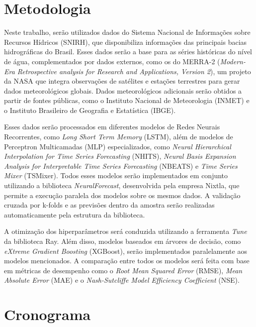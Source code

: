 \documentclass[
	12pt,				%
	openright,			%
	a4paper,			%
	english,			%
	french,				%
	spanish,			%
	brazil				%
	]{article}
\begin{document}
\section{Metodologia}
Neste trabalho, serão utilizados dados do Sistema Nacional de Informações sobre Recursos Hídricos (SNIRH), que 
disponibiliza informações das principais bacias hidrográficas do Brasil\cite{snirh}. Esses dados serão a base para as 
séries históricas do nível de água, complementados por dados externos, como os do MERRA-2 (\textit{Modern-Era 
Retrospective analysis for Research and Applications, Version 2}), um projeto da NASA que integra observações de 
satélites e estações terrestres para gerar dados meteorológicos globais\cite{nasa}. Dados meteorológicos adicionais 
serão obtidos a partir de fontes públicas, como o Instituto Nacional de Meteorologia (INMET) e o Instituto Brasileiro de 
Geografia e Estatística (IBGE)\cite{inmet}\cite{ibge}.

Esses dados serão processados em diferentes modelos de Redes Neurais Recorrentes, como \textit{Long Short Term Memory} 
(LSTM)\cite{hochreiter}, além de modelos de Perceptron Multicamadas (MLP) especializados, como \textit{Neural 
Hierarchical Interpolation for Time Series Forecasting} (NHITS)\cite{challu}, \textit{Neural Basis Expansion Analysis 
for Interpretable Time Series Forecasting} (NBEATS)\cite{oreshkin} e \textit{Time Series Mixer} (TSMixer)\cite{chen}. 
Todos esses modelos serão implementados em conjunto utilizando a biblioteca \textit{NeuralForecast}, desenvolvida pela 
empresa Nixtla\cite{neuralforecast}, que permite a execução paralela dos modelos sobre os mesmos dados. A validação 
cruzada por k-folds e as previsões dentro da amostra serão realizadas automaticamente pela estrutura da biblioteca.

A otimização dos hiperparâmetros será conduzida utilizando a ferramenta \textit{Tune} da biblioteca Ray\cite{tune}. Além 
disso, modelos baseados em árvores de decisão, como \textit{eXtreme Gradient Boosting} (XGBoost)\cite{chen_xgboost}, 
serão implementados paralelamente aos modelos mencionados. A comparação entre todos os  modelos será feita com base em 
métricas de desempenho como o \textit{Root Mean Squared Error} (RMSE), \textit{Mean Absolute Error} (MAE) e o 
\textit{Nash-Sutcliffe Model Efficiency Coefficient} (NSE).
\bigskip

\section{Cronograma}
\end{document}
